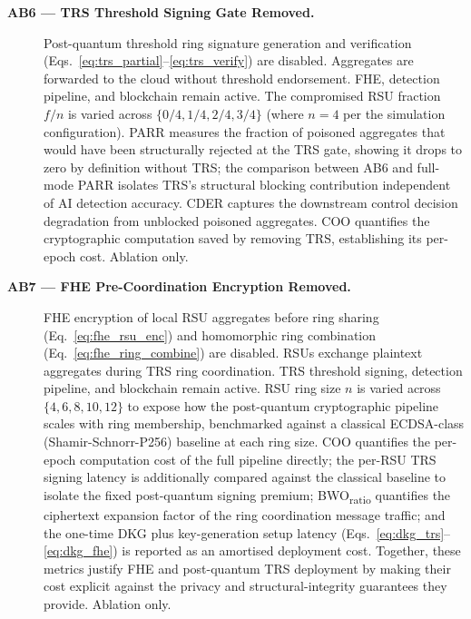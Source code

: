 \documentclass[12pt, a4paper]{report}
\begin{document}
\begin{description}
\item[\textbf{AB6 --- TRS Threshold Signing Gate Removed.}]
Post-quantum threshold ring signature generation and verification
(Eqs.~\ref{eq:trs_partial}--\ref{eq:trs_verify}) are disabled.
Aggregates are forwarded to the cloud without threshold endorsement.
FHE, detection pipeline, and blockchain remain active. The
compromised RSU fraction $f/n$ is varied across $\{0/4, 1/4, 2/4,
3/4\}$ (where $n = 4$ per the simulation configuration).
PARR measures the fraction of poisoned aggregates that would have
been structurally rejected at the TRS gate, showing it drops to
zero by definition without TRS; the comparison between AB6 and
full-mode PARR isolates TRS's structural blocking contribution
independent of AI detection accuracy. CDER captures the
downstream control decision degradation from unblocked poisoned
aggregates. COO quantifies the cryptographic computation saved
by removing TRS, establishing its per-epoch cost. Ablation
only.

\item[\textbf{AB7 --- FHE Pre-Coordination Encryption Removed.}]
FHE encryption of local RSU aggregates before ring sharing
(Eq.~\ref{eq:fhe_rsu_enc}) and homomorphic ring combination
(Eq.~\ref{eq:fhe_ring_combine}) are disabled. RSUs exchange
plaintext aggregates during TRS ring coordination. TRS threshold
signing, detection pipeline, and blockchain remain active. RSU
ring size $n$ is varied across $\{4, 6, 8, 10, 12\}$ to expose how
the post-quantum cryptographic pipeline scales with ring
membership, benchmarked against a classical ECDSA-class
(Shamir-Schnorr-P256) baseline at each ring size. COO quantifies the
per-epoch computation cost of the full pipeline directly; the
per-RSU TRS signing latency is additionally compared against the
classical baseline to isolate the fixed post-quantum signing
premium; BWO\textsubscript{ratio} quantifies the ciphertext
expansion factor of the ring coordination message traffic; and the
one-time DKG plus key-generation setup latency
(Eqs.~\ref{eq:dkg_trs}--\ref{eq:dkg_fhe}) is reported as an
amortised deployment cost. Together, these metrics justify FHE and
post-quantum TRS deployment by making their cost explicit against
the privacy and structural-integrity guarantees they provide.
Ablation only.


\end{description}
\end{document}
